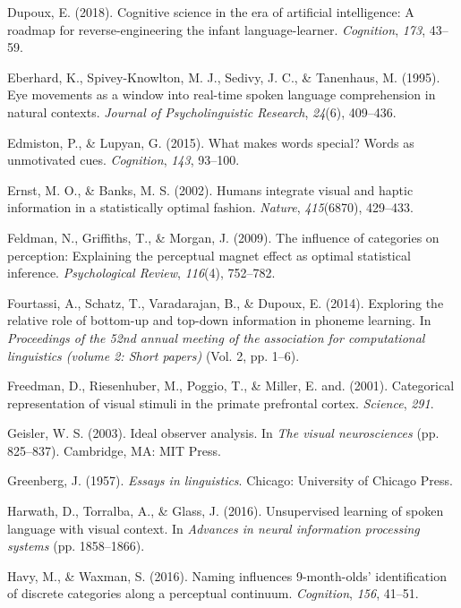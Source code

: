 \documentclass[english,floatsintext,man]{apa6}
\theoremstyle{definition}
\theoremstyle{definition}
\theoremstyle{definition}
\theoremstyle{remark}
\begin{document}
\hypertarget{ref-dupoux2018}{}
Dupoux, E. (2018). Cognitive science in the era of artificial
intelligence: A roadmap for reverse-engineering the infant
language-learner. \emph{Cognition}, \emph{173}, 43--59.

\hypertarget{ref-Eberhard1995}{}
Eberhard, K., Spivey-Knowlton, M. J., Sedivy, J. C., \& Tanenhaus, M.
(1995). Eye movements as a window into real-time spoken language
comprehension in natural contexts. \emph{Journal of Psycholinguistic
Research}, \emph{24}(6), 409--436.

\hypertarget{ref-edmiston2015}{}
Edmiston, P., \& Lupyan, G. (2015). What makes words special? Words as
unmotivated cues. \emph{Cognition}, \emph{143}, 93--100.

\hypertarget{ref-ernst02}{}
Ernst, M. O., \& Banks, M. S. (2002). Humans integrate visual and haptic
information in a statistically optimal fashion. \emph{Nature},
\emph{415}(6870), 429--433.

\hypertarget{ref-feldman2009}{}
Feldman, N., Griffiths, T., \& Morgan, J. (2009). The influence of
categories on perception: Explaining the perceptual magnet effect as
optimal statistical inference. \emph{Psychological Review},
\emph{116}(4), 752--782.

\hypertarget{ref-fourtassi2014b}{}
Fourtassi, A., Schatz, T., Varadarajan, B., \& Dupoux, E. (2014).
Exploring the relative role of bottom-up and top-down information in
phoneme learning. In \emph{Proceedings of the 52nd annual meeting of the
association for computational linguistics (volume 2: Short papers)}
(Vol. 2, pp. 1--6).

\hypertarget{ref-freedman2001}{}
Freedman, D., Riesenhuber, M., Poggio, T., \& Miller, E. and. (2001).
Categorical representation of visual stimuli in the primate prefrontal
cortex. \emph{Science}, \emph{291}.

\hypertarget{ref-Geisler2003}{}
Geisler, W. S. (2003). Ideal observer analysis. In \emph{The visual
neurosciences} (pp. 825--837). Cambridge, MA: MIT Press.

\hypertarget{ref-greenberg1957}{}
Greenberg, J. (1957). \emph{Essays in linguistics}. Chicago: University
of Chicago Press.

\hypertarget{ref-harwath2016}{}
Harwath, D., Torralba, A., \& Glass, J. (2016). Unsupervised learning of
spoken language with visual context. In \emph{Advances in neural
information processing systems} (pp. 1858--1866).

\hypertarget{ref-havy2016}{}
Havy, M., \& Waxman, S. (2016). Naming influences 9-month-olds'
identification of discrete categories along a perceptual continuum.
\emph{Cognition}, \emph{156}, 41--51.
\end{document}
